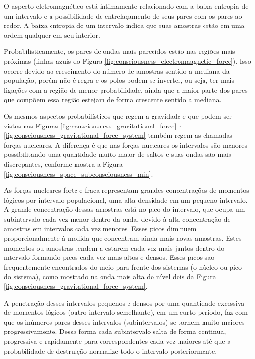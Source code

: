 O aspecto eletromagnético está intimamente relacionado com a baixa entropia de um intervalo e a possibilidade de entrelaçamento de seus pares com os pares ao redor. A baixa entropia de um intervalo indica que suas amostras estão em uma ordem qualquer em seu interior.

Probabilisticamente, os pares de ondas mais parecidos estão nas regiões mais próximas (linhas azuis do Figura \ref{fig:consciousness_electromaagnetic_force}). Isso ocorre devido ao crescimento do número de amostras sentido a mediana da população, porém não é regra e os polos podem se inverter, ou seja, ter mais ligações com a região de menor probabilidade, ainda que a maior parte dos pares que compõem essa região estejam de forma crescente sentido a mediana.

Os mesmos aspectos probabilísticos que regem a gravidade e que podem ser vistos nas Figuras \ref{fig:consciousness_gravitational_force} e \ref{fig:consciousness_gravitational_force_system} também regem as chamadas forças nucleares. A diferença é que nas forças nucleares os intervalos são menores possibilitando uma quantidade muito maior de saltos e suas ondas são mais discrepantes, conforme mostra a Figura \ref{fig:consciousness_space_subconsciousness_min}.

As forças nucleares forte e fraca representam grandes concentrações de momentos lógicos por intervalo populacional, uma alta densidade em um pequeno intervalo. A grande concentração dessas amostras está no pico do intervalo, que ocupa um subintervalo cada vez menor dentro da onda, devido à alta concentração de amostras em intervalos cada vez menores. Esses picos diminuem proporcionalmente à medida que concentram ainda mais novas amostras. Estes momentos ou amostras tendem a estarem cada vez mais juntos dentro do intervalo formando picos cada vez mais altos e densos. Esses picos são frequentemente encontrados do meio para frente dos sistemas (o núcleo ou pico do sistema), como mostrado na onda mais alta do nível dois da Figura \ref{fig:consciousness_gravitational_force_system}.

A penetração desses intervalos pequenos e densos por uma quantidade excessiva de momentos lógicos (outro intervalo semelhante), em um curto período, faz com que os inúmeros pares desses intervalos (subintervalos) se tornem muito maiores progressivamente. Dessa forma cada subintervalo salta de forma continua, progressiva e rapidamente para correspondentes cada vez maiores até que a probabilidade de destruição normalize todo o intervalo posteriormente.

